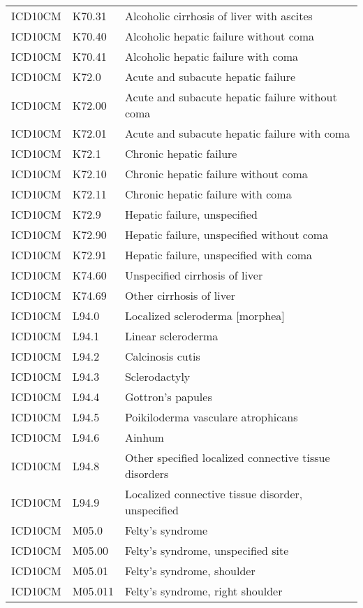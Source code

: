 \begin{longtable}{p{}p{}p{}}
  ICD10CM & K70.31 & Alcoholic cirrhosis of liver with ascites \\ 
  ICD10CM & K70.40 & Alcoholic hepatic failure without coma \\ 
  ICD10CM & K70.41 & Alcoholic hepatic failure with coma \\ 
  ICD10CM & K72.0 & Acute and subacute hepatic failure \\ 
  ICD10CM & K72.00 & Acute and subacute hepatic failure without coma \\ 
  ICD10CM & K72.01 & Acute and subacute hepatic failure with coma \\ 
  ICD10CM & K72.1 & Chronic hepatic failure \\ 
  ICD10CM & K72.10 & Chronic hepatic failure without coma \\ 
  ICD10CM & K72.11 & Chronic hepatic failure with coma \\ 
  ICD10CM & K72.9 & Hepatic failure, unspecified \\ 
  ICD10CM & K72.90 & Hepatic failure, unspecified without coma \\ 
  ICD10CM & K72.91 & Hepatic failure, unspecified with coma \\ 
  ICD10CM & K74.60 & Unspecified cirrhosis of liver \\ 
  ICD10CM & K74.69 & Other cirrhosis of liver \\ 
  ICD10CM & L94.0 & Localized scleroderma [morphea] \\ 
  ICD10CM & L94.1 & Linear scleroderma \\ 
  ICD10CM & L94.2 & Calcinosis cutis \\ 
  ICD10CM & L94.3 & Sclerodactyly \\ 
  ICD10CM & L94.4 & Gottron's papules \\ 
  ICD10CM & L94.5 & Poikiloderma vasculare atrophicans \\ 
  ICD10CM & L94.6 & Ainhum \\ 
  ICD10CM & L94.8 & Other specified localized connective tissue disorders \\ 
  ICD10CM & L94.9 & Localized connective tissue disorder, unspecified \\ 
  ICD10CM & M05.0 & Felty's syndrome \\ 
  ICD10CM & M05.00 & Felty's syndrome, unspecified site \\ 
  ICD10CM & M05.01 & Felty's syndrome, shoulder \\ 
  ICD10CM & M05.011 & Felty's syndrome, right shoulder \\ 

\end{longtable}
